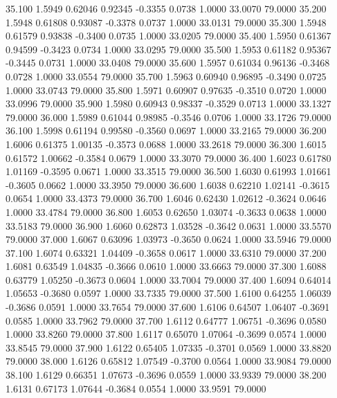   35.100   1.5949   0.62046   0.92345  -0.3355   0.0738   1.0000  33.0070  79.0000
  35.200   1.5948   0.61808   0.93087  -0.3378   0.0737   1.0000  33.0131  79.0000
  35.300   1.5948   0.61579   0.93838  -0.3400   0.0735   1.0000  33.0205  79.0000
  35.400   1.5950   0.61367   0.94599  -0.3423   0.0734   1.0000  33.0295  79.0000
  35.500   1.5953   0.61182   0.95367  -0.3445   0.0731   1.0000  33.0408  79.0000
  35.600   1.5957   0.61034   0.96136  -0.3468   0.0728   1.0000  33.0554  79.0000
  35.700   1.5963   0.60940   0.96895  -0.3490   0.0725   1.0000  33.0743  79.0000
  35.800   1.5971   0.60907   0.97635  -0.3510   0.0720   1.0000  33.0996  79.0000
  35.900   1.5980   0.60943   0.98337  -0.3529   0.0713   1.0000  33.1327  79.0000
  36.000   1.5989   0.61044   0.98985  -0.3546   0.0706   1.0000  33.1726  79.0000
  36.100   1.5998   0.61194   0.99580  -0.3560   0.0697   1.0000  33.2165  79.0000
  36.200   1.6006   0.61375   1.00135  -0.3573   0.0688   1.0000  33.2618  79.0000
  36.300   1.6015   0.61572   1.00662  -0.3584   0.0679   1.0000  33.3070  79.0000
  36.400   1.6023   0.61780   1.01169  -0.3595   0.0671   1.0000  33.3515  79.0000
  36.500   1.6030   0.61993   1.01661  -0.3605   0.0662   1.0000  33.3950  79.0000
  36.600   1.6038   0.62210   1.02141  -0.3615   0.0654   1.0000  33.4373  79.0000
  36.700   1.6046   0.62430   1.02612  -0.3624   0.0646   1.0000  33.4784  79.0000
  36.800   1.6053   0.62650   1.03074  -0.3633   0.0638   1.0000  33.5183  79.0000
  36.900   1.6060   0.62873   1.03528  -0.3642   0.0631   1.0000  33.5570  79.0000
  37.000   1.6067   0.63096   1.03973  -0.3650   0.0624   1.0000  33.5946  79.0000
  37.100   1.6074   0.63321   1.04409  -0.3658   0.0617   1.0000  33.6310  79.0000
  37.200   1.6081   0.63549   1.04835  -0.3666   0.0610   1.0000  33.6663  79.0000
  37.300   1.6088   0.63779   1.05250  -0.3673   0.0604   1.0000  33.7004  79.0000
  37.400   1.6094   0.64014   1.05653  -0.3680   0.0597   1.0000  33.7335  79.0000
  37.500   1.6100   0.64255   1.06039  -0.3686   0.0591   1.0000  33.7654  79.0000
  37.600   1.6106   0.64507   1.06407  -0.3691   0.0585   1.0000  33.7962  79.0000
  37.700   1.6112   0.64777   1.06751  -0.3696   0.0580   1.0000  33.8260  79.0000
  37.800   1.6117   0.65070   1.07064  -0.3699   0.0574   1.0000  33.8545  79.0000
  37.900   1.6122   0.65405   1.07335  -0.3701   0.0569   1.0000  33.8820  79.0000
  38.000   1.6126   0.65812   1.07549  -0.3700   0.0564   1.0000  33.9084  79.0000
  38.100   1.6129   0.66351   1.07673  -0.3696   0.0559   1.0000  33.9339  79.0000
  38.200   1.6131   0.67173   1.07644  -0.3684   0.0554   1.0000  33.9591  79.0000
